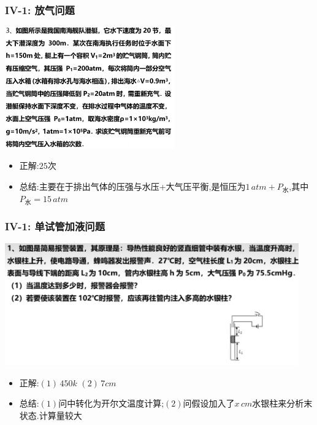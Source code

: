 \documentclass{article}
\begin{document}
\subsubsection{IV-1: 放气问题}
\includegraphics[width = 0.55\textwidth,keepaspectratio]{./pictures/2.3-11.png}

\begin{itemize}
    \item 正解:\quad $25$次
    \item 总结:\quad 主要在于排出气体的压强与水压+大气压平衡,是恒压为$1 \, atm + P_{\text{水}}$,其中$P_{\text{水}} = 15 \, atm$
\end{itemize}

\vspace{2em}

\subsubsection{IV-1: 单试管加液问题}
\includegraphics[width = 0.95\textwidth,keepaspectratio]{./pictures/2.3-12.png}

\begin{itemize}
    \item 正解:\quad $(1) \, 450k$  $(2) \, 7cm$
    \item 总结:\quad $(1)$问中转化为开尔文温度计算;$(2)$问假设加入了$x \, cm$水银柱来分析末状态.计算量较大
\end{itemize}

\vspace{2em}
\end{document}
